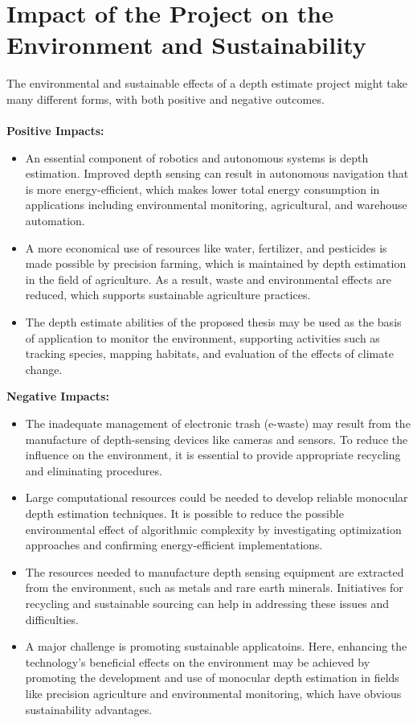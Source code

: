 \documentclass[a4paper,12pt,oneside]{book}
\begin{document}
\section{Impact of the Project on the Environment and Sustainability}
The environmental and sustainable effects of a depth estimate project might take many different forms, with both positive and negative outcomes.\\\\
\textbf{Positive Impacts:}
\begin{itemize}
\item An essential component of robotics and autonomous systems is depth estimation. Improved depth sensing can result in autonomous navigation that is more energy-efficient, which makes lower total energy consumption in applications including environmental monitoring, agricultural, and warehouse automation.

\item A more economical use of resources like water, fertilizer, and pesticides is made possible by precision farming, which is maintained by depth estimation in the field of agriculture. As a result, waste and environmental effects are reduced, which supports sustainable agriculture practices.

\item The depth estimate abilities of the proposed thesis may be used as the basis of application to monitor the environment, supporting activities such as tracking species, mapping habitats, and evaluation of the effects of climate change.
\end{itemize}


\textbf{Negative Impacts:}
\begin{itemize}
\item The inadequate management of electronic trash (e-waste) may result from the manufacture of depth-sensing devices like cameras and sensors. To reduce the influence on the environment, it is essential to provide appropriate recycling and eliminating procedures.

\item Large computational resources could be needed to develop reliable monocular depth estimation techniques. It is possible to reduce the possible environmental effect of algorithmic complexity by investigating optimization approaches and confirming energy-efficient implementations.

\item The resources needed to manufacture depth sensing equipment are extracted from the environment, such as metals and rare earth minerals. Initiatives for recycling and sustainable sourcing can help in addressing these issues and difficulties.

\item A major challenge is promoting sustainable applicatoins. Here, enhancing the technology's beneficial effects on the environment may be achieved by promoting the development and use of monocular depth estimation in fields like precision agriculture and environmental monitoring, which have obvious sustainability advantages.


\end{itemize}
\end{document}
